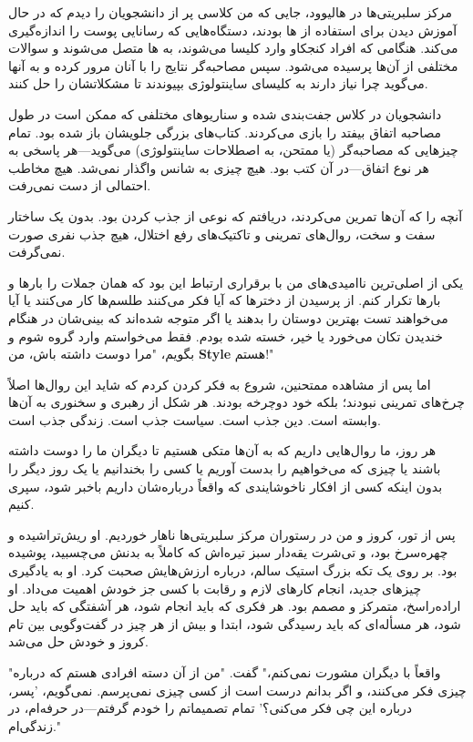
مرکز سلبریتی‌ها در هالیوود، جایی که من کلاسی پر از دانشجویان را دیدم که در حال آموزش دیدن برای استفاده از  ها بودند، دستگاه‌هایی که رسانایی پوست را اندازه‌گیری می‌کند. هنگامی که افراد کنجکاو وارد کلیسا می‌شوند، به  ها متصل می‌شوند و سوالات مختلفی از آن‌ها پرسیده می‌شود. سپس مصاحبه‌گر نتایج را با آنان مرور کرده و به آنها می‌گوید چرا نیاز دارند به کلیسای ساینتولوژی بپیوندند تا مشکلاتشان را حل کنند.

دانشجویان در کلاس جفت‌بندی شده و سناریوهای مختلفی که ممکن است در طول مصاحبه اتفاق بیفتد را بازی می‌کردند. کتاب‌های بزرگی جلویشان باز شده بود. تمام چیزهایی که مصاحبه‌گر (یا ممتحن، به اصطلاحات ساینتولوژی) می‌گوید—هر پاسخی به هر نوع اتفاق—در آن کتب بود. هیچ چیزی به شانس واگذار نمی‌شد. هیچ مخاطب احتمالی از دست نمی‌رفت.

آنچه را که آن‌ها تمرین می‌کردند، دریافتم که نوعی از جذب کردن بود. بدون یک ساختار سفت و سخت، روال‌های تمرینی و تاکتیک‌های رفع اختلال، هیچ جذب نفری صورت نمی‌گرفت.

یکی از اصلی‌ترین ناامیدی‌های من با برقراری ارتباط این بود که همان جملات را بارها و بارها تکرار کنم. از پرسیدن از دخترها که آیا فکر می‌کنند طلسم‌ها کار می‌کنند یا آیا می‌خواهند تست بهترین دوستان را بدهند یا اگر متوجه شده‌اند که بینی‌شان در هنگام خندیدن تکان می‌خورد یا خیر، خسته شده بودم. فقط می‌خواستم وارد گروه شوم و بگویم، "مرا دوست داشته باش، من \textbf{Style} هستم!"

اما پس از مشاهده ممتحنین، شروع به فکر کردن کردم که شاید این روال‌ها اصلاً چرخ‌های تمرینی نبودند؛ بلکه خود دوچرخه بودند. هر شکل از رهبری و سخنوری به آن‌ها وابسته است. دین جذب است. سیاست جذب است. زندگی جذب است.

هر روز، ما روال‌هایی داریم که به آن‌ها متکی هستیم تا دیگران ما را دوست داشته باشند یا چیزی که می‌خواهیم را بدست آوریم یا کسی را بخندانیم یا یک روز دیگر را بدون اینکه کسی از افکار ناخوشایندی که واقعاً درباره‌شان داریم باخبر شود، سپری کنیم.

پس از تور، کروز و من در رستوران مرکز سلبریتی‌ها ناهار خوردیم. او ریش‌تراشیده و چهره‌سرخ بود، و تی‌شرت یقه‌دار سبز تیره‌اش که کاملاً به بدنش می‌چسبید، پوشیده بود. بر روی یک تکه بزرگ استیک سالم، درباره ارزش‌هایش صحبت کرد. او به یادگیری چیزهای جدید، انجام کارهای لازم و رقابت با کسی جز خودش اهمیت می‌داد. او اراده‌راسخ، متمرکز و مصمم بود. هر فکری که باید انجام شود، هر آشفتگی که باید حل شود، هر مسأله‌ای که باید رسیدگی شود، ابتدا و بیش از هر چیز در گفت‌وگویی بین تام کروز و خودش حل می‌شد.

"واقعاً با دیگران مشورت نمی‌کنم،" گفت. "من از آن دسته افرادی هستم که درباره چیزی فکر می‌کنند، و اگر بدانم درست است از کسی چیزی نمی‌پرسم. نمی‌گویم، 'پسر، درباره این چی فکر می‌کنی؟' تمام تصمیماتم را خودم گرفتم—در حرفه‌ام، در زندگی‌ام."

